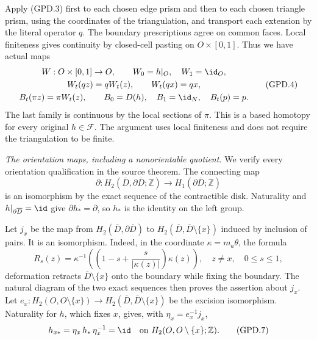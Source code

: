 Apply (GPD.3) first to each chosen edge prism and then to each
chosen triangle prism, using the coordinates of the triangulation,
and transport each extension by the literal operator $q$.
The boundary prescriptions agree on common faces. Local finiteness
gives continuity by closed-cell pasting on $O\times[0,1]$.
Thus we have actual maps
\[
 \begin{gathered}
 W:O\times[0,1]\to O,\qquad W_0=h|_O,\quad W_1=\id_O,\\
 W_t(qz)=qW_t(z),\qquad W_t(qx)=qx,\\
 B_t(\pi z)=\pi W_t(z),\qquad
 B_0=D(h),\quad B_1=\id_N,\quad B_t(p)=p .
 \end{gathered}                                                \tag{GPD.4}
\]
The last family is continuous by the local sections of $\pi$.
This is a based homotopy for every original $h\in\mathscr F$.
The argument uses local finiteness and does not require the
triangulation to be finite.

\emph{The orientation maps, including a nonorientable quotient.}
We verify every orientation qualification in the source theorem.
The connecting map
\[
 \partial:H_2(\overline D,\partial\overline D;\mathbb Z)
             \longrightarrow H_1(\partial\overline D;\mathbb Z)
                                                               \tag{GPD.5}
\]
is an isomorphism by the exact sequence of the contractible disk.
Naturality and $h|_{\partial\overline D}=\id$ give
$\partial h_*=\partial$, so $h_*$ is the identity on the left group.

Let $j_x$ be the map from
$H_2(\overline D,\partial\overline D)$ to
$H_2(\overline D,\overline D\setminus\{x\})$ induced by inclusion
of pairs. It is an isomorphism. Indeed, in the coordinate
$\kappa=m_a\theta$, the formula
\[
 R_s(z)=\kappa^{-1}
       \left(\left(1-s+\frac{s}{|\kappa(z)|}\right)\kappa(z)\right),
 \quad z\ne x,\quad 0\leq s\leq1,                             \tag{GPD.6}
\]
deformation retracts $\overline D\setminus\{x\}$ onto the boundary
while fixing the boundary. The natural diagram of the two exact
sequences then proves the assertion about $j_x$.
Let
$e_x:H_2(O,O\setminus\{x\})\to
H_2(\overline D,\overline D\setminus\{x\})$
be the excision isomorphism. Naturality for $h$, which fixes $x$,
gives, with $\eta_x=e_x^{-1}j_x$,
\[
 h_{x*}=\eta_x\,h_*\,\eta_x^{-1}
       =\id\quad\hbox{on }H_2(O,O\setminus\{x\};\mathbb Z).
                                                               \tag{GPD.7}
\]

